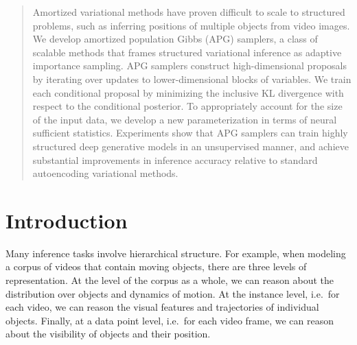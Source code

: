 \documentclass{article}
\theoremstyle{definition}
\begin{document}
\begin{abstract}

Amortized variational methods have proven difficult to scale to structured problems, such as inferring positions of multiple objects from video images. We develop amortized population Gibbs (APG) samplers, a class of scalable methods that frames structured variational inference as adaptive importance sampling. APG samplers construct high-dimensional proposals by iterating over updates to lower-dimensional blocks of variables. We train each conditional proposal by minimizing the inclusive KL divergence with respect to the conditional posterior. To appropriately account for the size of the input data, we develop a new parameterization in terms of neural sufficient statistics. Experiments show that APG samplers can train highly structured deep generative models in an unsupervised manner, and achieve substantial improvements in inference accuracy relative to standard autoencoding variational methods.

\end{abstract}

\vspace{-1.0em}
\section{Introduction}
\label{introduction}
Many inference tasks involve hierarchical structure. For example, when modeling a corpus of videos that contain moving objects, there are three levels of representation. At the level of the corpus as a whole, we can reason about the distribution over objects and dynamics of motion. At the instance level, i.e.~for each video, we can reason the visual features and trajectories of individual objects. Finally, at a data point level, i.e.~for each video frame, we can reason about the visibility of objects and their position.

\end{document}
